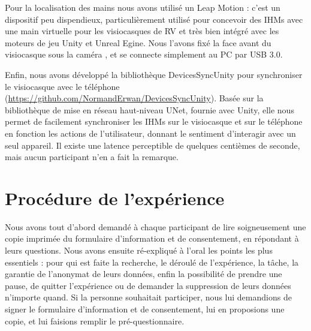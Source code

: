 
Pour la localisation des mains nous avons utilisé un Leap Motion : c'est un dispositif peu dispendieux, particulièrement utilisé pour concevoir des IHMs avec une main virtuelle pour les visiocasques de RV et très bien intégré avec les moteurs de jeu Unity et Unreal Egine. Nous l'avons fixé la face avant du visiocasque sous la caméra , et se connecte simplement au PC par USB 3.0.

Enfin, nous avons développé la bibliothèque DevicesSyncUnity pour synchroniser le visiocasque avec le téléphone (\url{https://github.com/NormandErwan/DevicesSyncUnity}). Basée sur la bibliothèque de mise en réseau haut-niveau UNet, fournie avec Unity, elle nous permet de facilement synchroniser les IHMs sur le visiocasque et sur le téléphone en fonction les actions de l'utilisateur, donnant le sentiment d'interagir avec un seul appareil. Il existe une latence perceptible de quelques centièmes de seconde, mais aucun participant n'en a fait la remarque.


\section{Procédure de l'expérience}
\label{sec:experiment_procedure}

Nous avons tout d'abord demandé à chaque participant de lire soigneusement une copie imprimée du formulaire d'information et de consentement, en répondant à leurs questions. Nous avons ensuite ré-expliqué à l'oral les points les plus essentiels : pour qui est faite la recherche, le déroulé de l'expérience, la tâche, la garantie de l'anonymat de leurs données, enfin la possibilité de prendre une pause, de quitter l'expérience ou de demander la suppression de leurs données n'importe quand. Si la personne souhaitait participer, nous lui demandions de signer le formulaire d'information et de consentement, lui en proposions une copie, et lui faisions remplir le pré-questionnaire.

